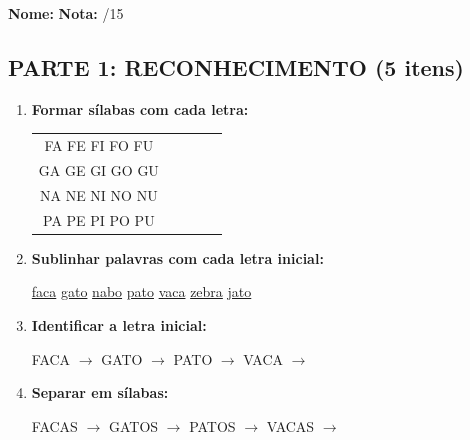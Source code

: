 \begin{exercicio}

\noindent\textbf{Nome:} \underline{\hspace{4cm}} \quad \textbf{Nota:} \underline{\hspace{1cm}}/15

\subsection*{PARTE 1: RECONHECIMENTO (5 itens)}

\begin{enumerate}
  \item \textbf{Formar sílabas com cada letra:}
  \begin{center}
  \begin{tabular}{ccccc}
  FA \quad FE \quad FI \quad FO \quad FU \\
  GA \quad GE \quad GI \quad GO \quad GU \\
  NA \quad NE \quad NI \quad NO \quad NU \\
  PA \quad PE \quad PI \quad PO \quad PU
  \end{tabular}
  \end{center}

  \item \textbf{Sublinhar palavras com cada letra inicial:}
  \begin{center}
  \uline{faca} \quad \uline{gato} \quad \uline{nabo} \quad \uline{pato} \quad \uline{vaca} \quad \uline{zebra} \quad \uline{jato}
  \end{center}

  \item \textbf{Identificar a letra inicial:}
  \begin{center}
  FACA $\rightarrow$ \underline{\hspace{1cm}} \quad GATO $\rightarrow$ \underline{\hspace{1cm}} \quad PATO $\rightarrow$ \underline{\hspace{1cm}} \quad VACA $\rightarrow$ \underline{\hspace{1cm}}
  \end{center}

  \item \textbf{Separar em sílabas:}
  \begin{center}
  FACAS $\rightarrow$ \underline{\hspace{1.5cm}} \quad GATOS $\rightarrow$ \underline{\hspace{1.5cm}} \quad PATOS $\rightarrow$ \underline{\hspace{1.5cm}} \quad VACAS $\rightarrow$ \underline{\hspace{1.5cm}}
  \end{center}


\end{enumerate}
\end{exercicio}

